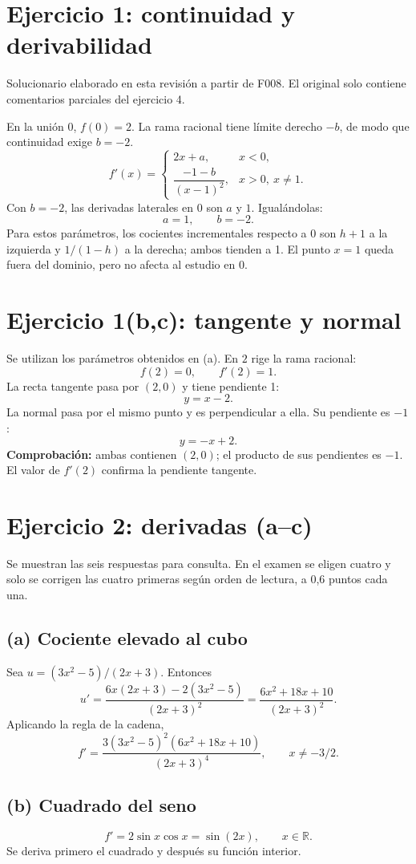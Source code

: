 \documentclass[11pt]{article}
\begin{document}
\section*{Ejercicio 1: continuidad y derivabilidad}
Solucionario elaborado en esta revisión a partir de F008. El original solo contiene comentarios parciales del ejercicio 4.

En la unión $0$, $f(0)=2$. La rama racional tiene límite derecho $-b$, de modo que continuidad exige $b=-2$.
\[f'(x)=\begin{cases}2x+a,&x<0,\\\dfrac{-1-b}{(x-1)^2},&x>0,\ x\neq1.\end{cases}\]
Con $b=-2$, las derivadas laterales en $0$ son $a$ y $1$. Igualándolas:
\[\boxed{a=1,\qquad b=-2}.\]
Para estos parámetros, los cocientes incrementales respecto a $0$ son $h+1$ a la izquierda y $1/(1-h)$ a la derecha; ambos tienden a 1. El punto $x=1$ queda fuera del dominio, pero no afecta al estudio en $0$.
\section*{Ejercicio 1(b,c): tangente y normal}
Se utilizan los parámetros obtenidos en (a). En $2$ rige la rama racional:
\[f(2)=0,\qquad f'(2)=1.\]
La recta tangente pasa por $(2,0)$ y tiene pendiente 1:
\[\boxed{y=x-2}.\]
La normal pasa por el mismo punto y es perpendicular a ella. Su pendiente es $-1$:
\[\boxed{y=-x+2}.\]
\textbf{Comprobación:} ambas contienen $(2,0)$; el producto de sus pendientes es $-1$. El valor de $f'(2)$ confirma la pendiente tangente.
\clearpage
\section*{Ejercicio 2: derivadas (a--c)}
Se muestran las seis respuestas para consulta. En el examen se eligen cuatro y solo se corrigen las cuatro primeras según orden de lectura, a 0,6 puntos cada una.
\subsection*{(a) Cociente elevado al cubo}
Sea $u=(3x^2-5)/(2x+3)$. Entonces
\[u'=\frac{6x(2x+3)-2(3x^2-5)}{(2x+3)^2}=\frac{6x^2+18x+10}{(2x+3)^2}.\]
Aplicando la regla de la cadena,
\[\boxed{f'=\frac{3(3x^2-5)^2(6x^2+18x+10)}{(2x+3)^4}},\qquad x\neq-3/2.\]
\subsection*{(b) Cuadrado del seno}
\[\boxed{f'=2\sin x\cos x=\sin(2x)},\qquad x\in\mathbb R.\]
Se deriva primero el cuadrado y después su función interior.
\end{document}
